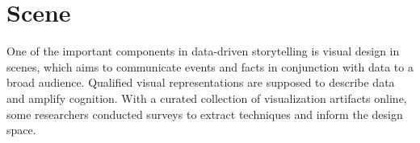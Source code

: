 
\section{Scene}
One of the important components in data-driven storytelling is visual design in scenes, which aims to communicate events and facts in conjunction with data to a broad audience. Qualified visual representations are supposed to describe data and amplify cognition. With a curated collection of visualization artifacts online, some researchers conducted surveys to extract techniques and inform the design space.


